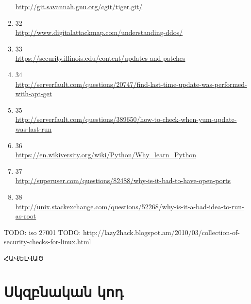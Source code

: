 \documentclass[a4paper,12pt]{article}
\begin{document}
\begin{sloppypar}
\begin{enumerate}
	\url{http://git.savannah.gnu.org/cgit/tiger.git/}
\item 32 \\
	\url{http://www.digitalattackmap.com/understanding-ddos/}
\item 33 \\
	\url{https://security.illinois.edu/content/updates-and-patches}
\item 34 \\
	\url{http://serverfault.com/questions/20747/find-last-time-update-was-performed-with-apt-get}
\item 35 \\
	\url{http://serverfault.com/questions/389650/how-to-check-when-yum-update-was-last-run}
\item 36 \\
	\url{https://en.wikiversity.org/wiki/Python/Why\_learn\_Python}
\item 37 \\
	\url{http://superuser.com/questions/82488/why-is-it-bad-to-have-open-ports}
\item 38 \\
	\url{http://unix.stackexchange.com/questions/52268/why-is-it-a-bad-idea-to-run-as-root}
\end{enumerate}


TODO: iso 27001
TODO: http://lazy2hack.blogspot.am/2010/03/collection-of-security-checks-for-linux.html




\newpage
\vspace*{\fill}
\begingroup
\centering
\centerline{\Huge{ՀԱՎԵԼՎԱԾ}}
\endgroup
\vspace*{\fill}
\newpage


\section*{Սկզբնական կոդ}






















\end{sloppypar}
\end{document}
